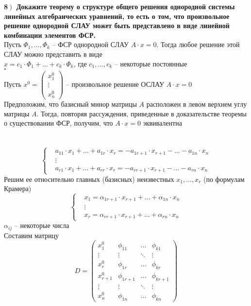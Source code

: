 \documentclass[a4paper,12pt]{article}
\begin{document}
    \textbf{8$\left.\right)$ Докажите теорему о структуре общего решения однородной системы линейных алгебраических уравнений, то есть о том, что произвольное решение однородной СЛАУ может быть представлено в виде линейной комбинации элементов ФСР.}\\
    Пусть $\Phi_1, \ldots, \Phi_k$ -- ФСР однородной СЛАУ $A\cdot x=0$. Тогда любое решение этой СЛАУ можно представить в виде\\
    $x=c_1\cdot\Phi_1+\ldots+c_k\cdot\Phi_k$, где $c_1,\ldots, c_k$ -- некоторые постоянные\\
    $\square$\\
    Пусть $x^0=\begin{pmatrix}
                   x_1^0  \\
                   \vdots \\
                   x_n^0
    \end{pmatrix}$ -- произвольное решение ОСЛАУ $A\cdot x=0$\\
    Предположим, что базисный минор матрицы $A$ расположен в левом верхнем углу матрицы $A$. Тогда, повторяя рассуждения, приведенные в доказательстве теоремы о существовании ФСР, получим, что $A\cdot x=0$ эквивалентна\\
    \\
    \\
    \[\left\{
    \begin{aligned}
        &a_{11}\cdot x_1+\ldots+a_{1r}\cdot x_r=-a_{1r+1}\cdot x_{r+1}-\ldots-a_{1n}\cdot x_n\\
        &\vdots\\
        &a_{r1}\cdot x_1+\ldots+a_{rr}\cdot x_r=-a_{rr+1}\cdot x_{r+1}-\ldots-a_{rn}\cdot x_n
    \end{aligned}\right.
    \]
    Решим ее относительно главных (базисных) неизвестных $x_1, \ldots, x_r$ (по формулам Крамера)
    \[\left\{
    \begin{aligned}
        &x_1=\alpha_{1r+1}\cdot x_{r+1}+\ldots+\alpha_{1n}\cdot x_n\\
        &\vdots\\
        &x_r=\alpha_{rr+1}\cdot x_{r+1}+\ldots+\alpha_{rn}\cdot x_n
    \end{aligned}\right.\tag{9.1}\label{9.1}
    \]
    $\alpha_{ij}$ -- некоторые числа\\
    Составим матрицу
    \[
        D=\begin{pmatrix}
              x_1^0     & \phi_{11}   & \ldots & \phi_{k1}   \\
              \vdots    & \vdots      & \ddots & \vdots      \\
              x_r^0     & \phi_{1r}   & \ldots & \phi_{kr}   \\
              x_{r+1}^0 & \phi_{1r+1} & \ldots & \phi_{kr+1} \\
              \vdots    & \vdots      & \ddots & \vdots      \\
              x_n^0     & \phi_{1n}   & \ldots & \phi_{kn}
        \end{pmatrix}
    \]
\end{document}
